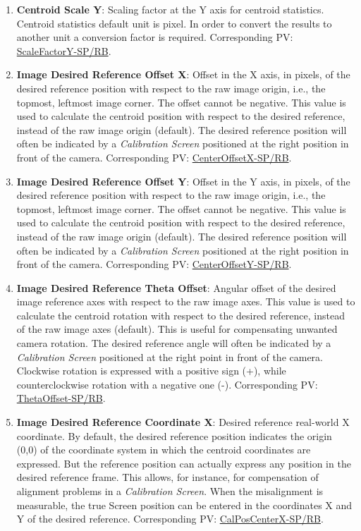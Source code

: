 \documentclass[openany]{article}
\begin{document}
\begin{enumerate}
            \item \textbf{Centroid Scale Y}: Scaling factor at the Y axis for centroid statistics. Centroid statistics default unit is pixel. In order to convert the results to another unit a conversion factor is required. Corresponding PV: \hyperlink{pv:scale-factor-y}{ScaleFactorY-SP/RB}.
            \item \textbf{Image Desired Reference Offset X}: Offset in the X axis, in pixels, of the desired reference position with respect to the raw image origin, i.e., the topmost, leftmost image corner. The offset cannot be negative. This value is used to calculate the centroid position with respect to the desired reference, instead of the raw image origin (default). The desired reference position will often be indicated by a \emph{Calibration Screen} positioned at the right position in front of the camera. Corresponding PV: \hyperlink{pv:center-offset-x}{CenterOffsetX-SP/RB}.
            \item \textbf{Image Desired Reference Offset Y}: Offset in the Y axis, in pixels, of the desired reference position with respect to the raw image origin, i.e., the topmost, leftmost image corner. The offset cannot be negative. This value is used to calculate the centroid position with respect to the desired reference, instead of the raw image origin (default). The desired reference position will often be indicated by a \emph{Calibration Screen} positioned at the right position in front of the camera. Corresponding PV: \hyperlink{pv:center-offset-y}{CenterOffsetY-SP/RB}.
            \item \textbf{Image Desired Reference Theta Offset}: Angular offset of the desired image reference axes with respect to the raw image axes. This value is used to calculate the centroid rotation with respect to the desired reference, instead of the raw image axes (default). This is useful for compensating unwanted camera rotation. The desired reference angle will often be indicated by a \emph{Calibration Screen} positioned at the right point in front of the camera. Clockwise rotation is expressed with a positive sign (+), while counterclockwise rotation with a negative one (-). Corresponding PV: \hyperlink{pv:theta-offset}{ThetaOffset-SP/RB}.
            \item \textbf{Image Desired Reference Coordinate X}: Desired reference real-world X coordinate. By default, the desired reference position indicates the origin (0,0) of the coordinate system in which the centroid coordinates are expressed. But the reference position can actually express any position in the desired reference frame. This allows, for instance, for compensation of alignment problems in a \emph{Calibration Screen}. When the misalignment is measurable, the true Screen position can be entered in the coordinates X and Y of the desired reference. Corresponding PV: \hyperlink{pv:cal-pos-center-x}{CalPosCenterX-SP/RB}.

\end{enumerate}
\end{document}
